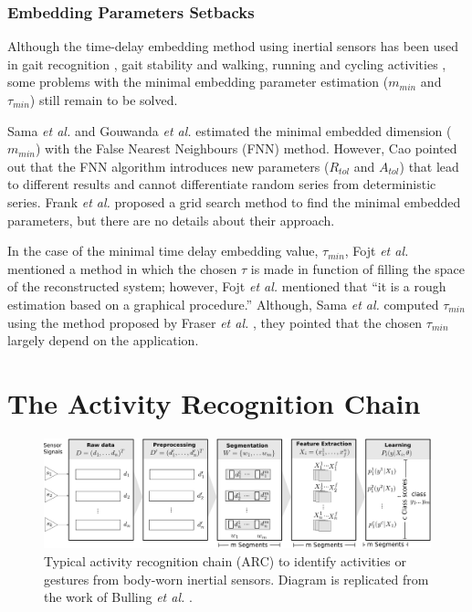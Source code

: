 \documentclass[10pt,journal,compsoc]{IEEEtran}
\begin{document}
\subsubsection{Embedding Parameters Setbacks}
Although the time-delay embedding method using inertial 
sensors has been used in gait recognition \cite{Sama2013}, gait stability 
\cite{Gouwanda2012} and walking, running and cycling activities \cite{Frank2010},
some problems with the minimal embedding parameter estimation  
($m_{min}$ and $\tau_{min}$) still remain to be solved.

Sama \textit{et al.} \cite{Sama2013} and Gouwanda \textit{et al.} \cite{Gouwanda2012} estimated 
the minimal embedded dimension ($m_{min}$) with the False Nearest 
Neighbours (FNN) method. However, Cao \cite{Cao1997} pointed 
out that the FNN algorithm introduces new parameters 
($R_{tol}$ and $A_{tol}$) that lead to different results and cannot 
differentiate random series from deterministic series. Frank 
\textit{et al.} \cite{Frank2010} proposed a grid search method to find the minimal 
embedded parameters, but there are no details about their 
approach.

In the case of the minimal time delay embedding value, 
$\tau_{min}$, Fojt \textit{et al.} \cite{Fojt1998} mentioned a method in which the 
chosen $\tau$ is made in function of filling the space of the 
reconstructed system; however, Fojt \textit{et al.} \cite{Fojt1998} mentioned that 
``it is a rough estimation based on a graphical procedure.''
Although, Sama \textit{et al.} \cite{Sama2013} computed $\tau_{min}$ using the method 
proposed by Fraser \textit{et al.} \cite{Fraser1986}, they pointed that the chosen 
$\tau_{min}$ largely depend on the application.


\section{The Activity Recognition Chain}

\begin{figure}
\centering    
 \includegraphics[width=\textwidth]{ARC02}
\caption[PA]{Typical activity recognition chain (ARC) to identify activities or gestures
from body-worn inertial sensors. 
Diagram is replicated from the work of Bulling \textit{et al.} \cite{bulling2014}.}
\label{fig:arc}
\end{figure}
\end{document}
